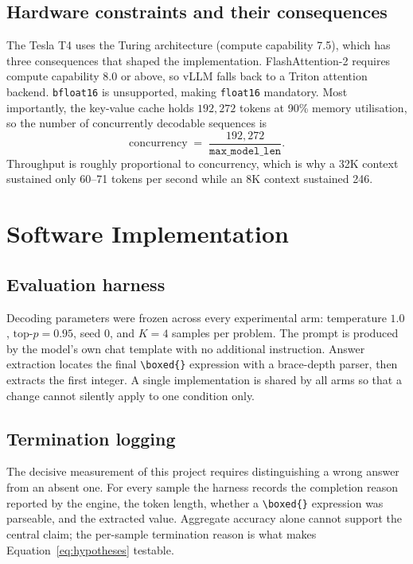 \documentclass[12pt,a4paper,oneside]{report}
\newcommand{\boxedans}{\texttt{\textbackslash boxed\{\}}}
\begin{document}
\subsection{Hardware constraints and their consequences}

The Tesla T4 uses the Turing architecture (compute capability 7.5), which has
three consequences that shaped the implementation. FlashAttention-2 requires
compute capability 8.0 or above, so vLLM falls back to a Triton attention
backend. \texttt{bfloat16} is unsupported, making \texttt{float16} mandatory.
Most importantly, the key-value cache holds $192{,}272$ tokens at 90\% memory
utilisation, so the number of concurrently decodable sequences is
\begin{equation}
\text{concurrency} \;=\; \frac{192{,}272}{\texttt{max\_model\_len}} .
\label{eq:concurrency}
\end{equation}
Throughput is roughly proportional to concurrency, which is why a 32K context
sustained only 60--71 tokens per second while an 8K context sustained 246.

\section{Software Implementation}

\subsection{Evaluation harness}

Decoding parameters were frozen across every experimental arm: temperature
$1.0$, $\text{top-}p = 0.95$, seed $0$, and $K=4$ samples per problem. The
prompt is produced by the model's own chat template with no additional
instruction. Answer extraction locates the final \boxedans{} expression with a
brace-depth parser, then extracts the first integer. A single implementation is
shared by all arms so that a change cannot silently apply to one condition only.

\subsection{Termination logging}

The decisive measurement of this project requires distinguishing a wrong answer
from an absent one. For every sample the harness records the completion reason
reported by the engine, the token length, whether a \boxedans{} expression was
parseable, and the extracted value. Aggregate accuracy alone cannot support the
central claim; the per-sample termination reason is what makes
Equation~\eqref{eq:hypotheses} testable.
\end{document}
